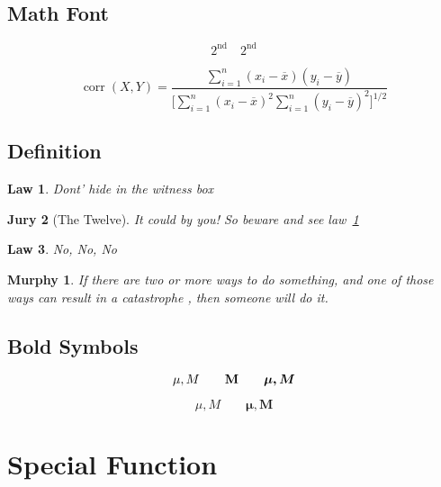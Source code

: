 \documentclass[a4paper,11pt]{article}
\newtheorem{law}{Law}
\newtheorem{mur}{Murphy}[subsection]
\newtheorem{jury}[law]{Jury}
\begin{document}
\subsection{Math Font} 
\begin{equation}
    2^{\textrm{nd}} \quad
    2^{\mathrm{nd}} 
\end{equation}

\begin{displaymath}
    \mathop{\mathrm{corr}}(X,Y)=
    \frac{\displaystyle
        \sum^{n}_{i=1}(x_i-\overline{x})(y_i-\overline{y})}
    {\displaystyle\biggl[\sum_{i=1}^n (x_i - \overline{x})^2
    \sum_{i=1}^n (y_i - \overline{y})^2
    \biggr]^{1/2}}
\end{displaymath}

\subsection{Definition}
\begin{law} \label{law:box}
    Dont' hide in the witness box
\end{law}

\begin{jury}[The Twelve]
It could by you! So beware and
see law~\ref{law:box}
\end{jury}
\begin{law}No, No, No\end{law}

\begin{flushleft}
    \begin{mur}
        If there are two or more
        ways to do something, and one
        of those ways can result in a catastrophe
        , then someone will do it.
    \end{mur}
\end{flushleft}

\subsection{Bold Symbols}

\begin{displaymath}
    \mu, M \qquad \mathbf{M} \qquad
    \mbox{\boldmath $\mu, M$}
\end{displaymath}

\begin{displaymath}
    \mu, M \qquad
    \boldsymbol{\mu}, \boldsymbol{M}
\end{displaymath}

\section{Special Function}
\end{document}
